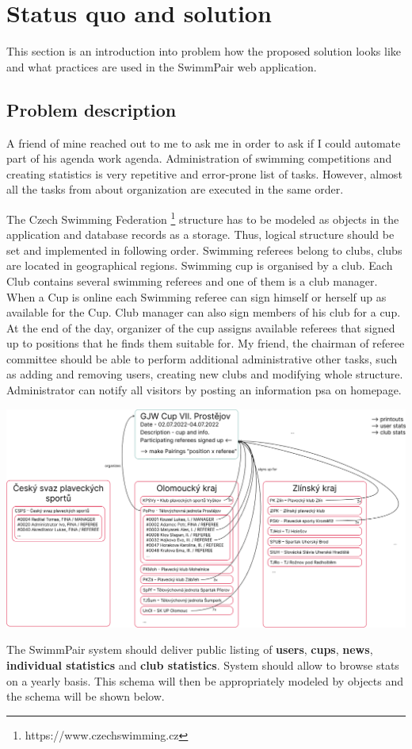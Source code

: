 \chapter{Status quo and solution}
This section is an introduction into problem how the proposed solution looks like and what practices are used in the SwimmPair web application. 
\section{Problem description}
\par
A friend of mine reached out to me to ask me in order to ask if I could automate part of his agenda work agenda. Administration of swimming competitions and creating statistics is very repetitive and error-prone list of tasks. However, almost all the tasks from about organization are executed in the same order.
\par
The Czech Swimming Federation \footnote{https://www.czechswimming.cz} structure has to be modeled as objects in the application and database records as a storage. Thus, logical structure should be set and implemented in following order. Swimming referees belong to clubs, clubs are located in geographical regions. Swimming cup is organised by a club. Each Club contains several swimming referees and one of them is a club manager. When a Cup is online each Swimming referee can sign himself or herself up as available for the Cup. Club manager can also sign members of his club for a cup. At the end of the day, organizer of the cup assigns available referees that signed up to positions that he finds them suitable for. My friend, the chairman of referee committee should be able to perform additional administrative other tasks, such as adding and removing users, creating new clubs and modifying whole structure. Administrator can notify all visitors by posting an information psa on homepage.
\par
\includegraphics[scale=0.335]{img/swimmpair_schema.png}
\par
The SwimmPair system should deliver public listing of \textbf{users}, \textbf{cups}, \textbf{news}, \textbf{individual statistics} and \textbf{club statistics}. System should allow to browse stats on a yearly basis. This schema will then be appropriately modeled by objects and the schema will be shown below. 
\newpage
